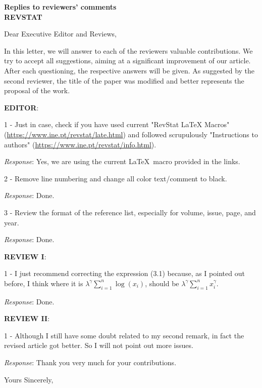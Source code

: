 \documentclass[version=last,12pt,{"maintainersDelight"}]{scrlttr2}
\begin{document}
\begin{letter}{\textbf{Replies to reviewers' comments}\\\textbf{REVSTAT}\\}
\opening{Dear Executive Editor and Reviews,}

In this letter, we will answer to each of the reviewers valuable
contributions. We try to accept all suggestions, aiming at a significant
improvement of our article. After each questioning, the respective
answers will be given. As suggested by the second reviewer, the title of
the paper was modified and better represents the proposal of the work.

\textbf{EDITOR}:

1 -  Just in case, check if you have used current "RevStat LaTeX Macros" (\url{https://www.ine.pt/revstat/late.html}) and followed scrupulously "Instructions to authors" (\url{https://www.ine.pt/revstat/info.html}).

\emph{Response}: {\color{red} Yes, we are using the current \LaTeX\, macro provided in the links}.

2 - Remove line numbering and change all color text/comment to black.

\emph{Response}:  {\color{red} Done}.

3 - Review the format of the reference list, especially for volume, issue, page, and year.  

\emph{Response}:  {\color{red} Done}.

\textbf{REVIEW I}:

1 - I just recommend correcting the expression (3.1) because, as I pointed out before, I think where it is $\lambda^\gamma\sum_{i=1}^n \log(x_i)$, should be $\lambda^\gamma\sum_{i=1}^n x_i^\gamma$.

\emph{Response}: {\color{red} Done}.

\textbf{REVIEW II}:

1 - Although I still have some doubt related to my second remark, in fact the revised article got better. So I will not point out more issues.

\emph{Response}:  {\color{red} Thank you very much for your contributions}.

\closing{Yours Sincerely,}


 \end{letter}
\end{document}
